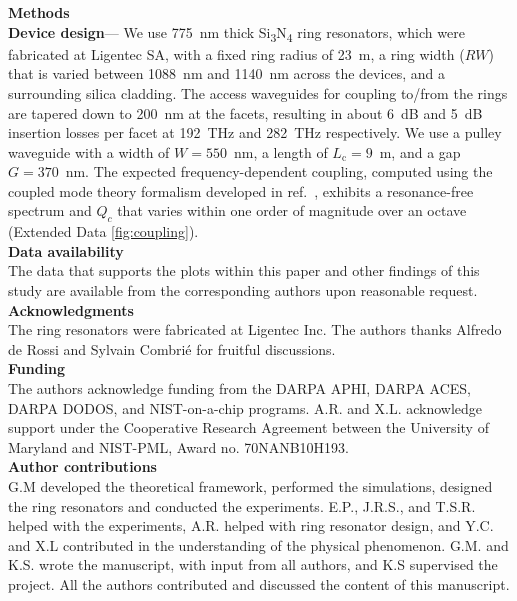 \documentclass[reprint,superscriptaddress, amsmath,amssymb,pra, aps,floatfix,longbibliography]{revtex4-1}
\begin{document}


%
\vspace{3ex}
\noindent \textbf{\large Methods}\\
\textbf{Device design}— We use 775~nm thick Si\textsubscript{3}N\textsubscript{4} ring resonators, which were fabricated at Ligentec SA, with a fixed ring radius of 23~{\textmu}m, a ring width ($RW$) that is varied between 1088~nm and 1140~nm across the devices, and a surrounding silica cladding. The access waveguides for coupling to/from the rings are tapered down to 200~nm at the facets, resulting in about 6~dB and 5~dB insertion losses per facet at 192~THz and 282~THz respectively. We use a pulley waveguide with a width of $W=550$~nm, a length of $L_\mathrm{c}=9$~{\textmu}m, and a gap $G=370$~nm. The expected frequency-dependent coupling, computed using the coupled mode theory formalism developed in ref.~\cite{moille_broadband_2019}, exhibits a resonance-free spectrum and $Q_c$ that varies within one order of magnitude over an octave (Extended Data \cref{fig:coupling}). \\

\noindent \textbf{\large Data availability} \\
The data that supports the plots within this paper and other findings of this study are available from the corresponding authors upon reasonable request.\\

\noindent \textbf{\large Acknowledgments} \\
The ring resonators were fabricated at Ligentec Inc. The authors thanks Alfredo de Rossi and Sylvain Combrié for fruitful discussions. \\

\noindent \textbf{\large Funding} \\
The authors acknowledge funding from the DARPA APHI, DARPA ACES, DARPA DODOS, and NIST-on-a-chip programs. A.R. and X.L. acknowledge support under the Cooperative Research Agreement between the University of Maryland and NIST-PML, Award no. 70NANB10H193.\\

\noindent \textbf{\large Author contributions}\\
G.M developed the theoretical framework, performed the simulations, designed the ring resonators and conducted the experiments. E.P., J.R.S., and T.S.R. helped with the experiments, A.R. helped with ring resonator design, and Y.C. and X.L contributed in the understanding of the physical phenomenon. G.M. and K.S. wrote the manuscript, with input from all authors, and K.S supervised the project. All the authors contributed and discussed the content of this manuscript.\\
\end{document}
